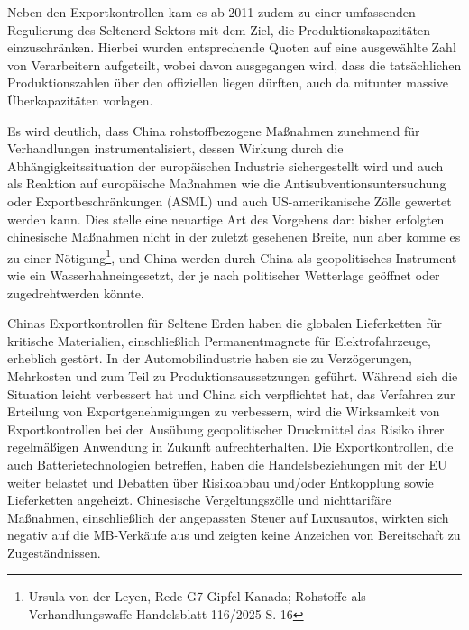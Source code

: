 \documentclass[12pt,a4paper,oneside]{book} %
\begin{document}
Neben den Exportkontrollen kam es ab 2011 zudem zu einer umfassenden Regulierung des Seltenerd-Sektors mit dem Ziel, die Produktionskapazitäten einzuschränken. Hierbei wurden entsprechende Quoten auf eine ausgewählte Zahl von Verarbeitern aufgeteilt, wobei davon ausgegangen wird, dass die tatsächlichen Produktionszahlen über den offiziellen liegen dürften, auch da mitunter massive Überkapazitäten vorlagen.\autocite{Top Commodity News 57, S. 1ff}


Es wird deutlich, dass China rohstoffbezogene Maßnahmen zunehmend für Verhandlungen instrumentalisiert, dessen Wirkung durch die Abhängigkeitssituation der europäischen Industrie sichergestellt wird und auch als Reaktion auf europäische Maßnahmen wie die Antisubventionsuntersuchung oder Exportbeschränkungen (ASML)  und auch US-amerikanische Zölle gewertet werden kann. Dies stelle eine neuartige Art des Vorgehens dar: bisher erfolgten chinesische Maßnahmen nicht in der zuletzt gesehenen Breite, nun aber komme es zu einer \glqq Nötigung\grqq \footnote{Ursula von der Leyen, Rede G7 Gipfel Kanada; Rohstoffe als Verhandlungswaffe Handelsblatt 116/2025 S. 16}, und China werden durch China als geopolitisches Instrument wie ein \glqq Wasserhahn\grqq eingesetzt, der \glqq je nach politischer Wetterlage geöffnet oder zugedreht\grqq werden könnte.\autocite{Neckel: Exportkontrolle im geopolitischen Wettstreit(EuZW 2025, 710, 715)}

Chinas Exportkontrollen für Seltene Erden haben die globalen Lieferketten für kritische Materialien, einschließlich Permanentmagnete für Elektrofahrzeuge, erheblich gestört. In der Automobilindustrie haben sie zu Verzögerungen, Mehrkosten und zum Teil zu Produktionsaussetzungen geführt. Während sich die Situation leicht verbessert hat und China sich verpflichtet hat, das Verfahren zur Erteilung von Exportgenehmigungen zu verbessern, wird die Wirksamkeit von Exportkontrollen bei der Ausübung geopolitischer Druckmittel das Risiko ihrer regelmäßigen Anwendung in Zukunft aufrechterhalten. Die Exportkontrollen, die auch Batterietechnologien betreffen, haben die Handelsbeziehungen mit der EU weiter belastet und Debatten über Risikoabbau und/oder Entkopplung sowie Lieferketten angeheizt. Chinesische Vergeltungszölle und nichttarifäre Maßnahmen, einschließlich der angepassten Steuer auf Luxusautos, wirkten sich negativ auf die MB-Verkäufe aus und zeigten keine Anzeichen von Bereitschaft zu Zugeständnissen.
\end{document}

